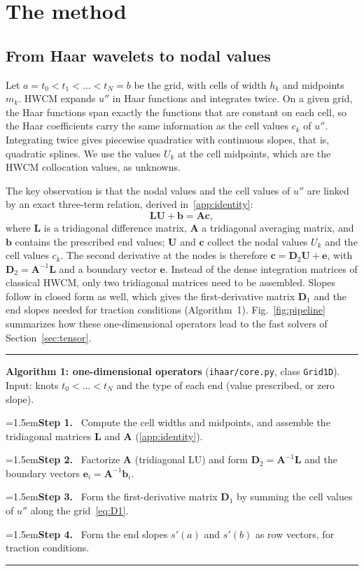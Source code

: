 \documentclass[preprint,12pt]{elsarticle}
\theoremstyle{remark}
\newcommand{\step}[1]{\par\noindent\hangindent=1.5em\hangafter=1\textbf{Step #1.}\ }
\begin{document}
\section{The method}\label{sec:method}
\subsection{From Haar wavelets to nodal values}
Let $a=t_0<t_1<\dots<t_N=b$ be the grid, with cells of width $h_k$ and midpoints $m_k$. HWCM expands
$u''$ in Haar functions and integrates twice. On a given grid, the Haar functions span exactly the
functions that are constant on each cell, so the Haar coefficients carry the same information as the
cell values $c_k$ of $u''$. Integrating twice gives piecewise quadratics with continuous slopes, that is,
quadratic splines. We use the values $U_k$ at the cell midpoints, which are the HWCM collocation values,
as unknowns.

The key observation is that the nodal values and the cell values of $u''$ are linked by an exact
three-term relation, derived in~\ref{app:identity}:
\begin{equation}\label{eq:identity}
\mathbf L\mathbf U+\mathbf b=\mathbf A\mathbf c,
\end{equation}
where $\mathbf L$ is a tridiagonal difference matrix, $\mathbf A$ a tridiagonal averaging matrix, and $\mathbf b$ contains the
prescribed end values; $\mathbf U$ and $\mathbf c$ collect the nodal values $U_k$ and the cell values $c_k$. The second derivative at the nodes is therefore $\mathbf c=\mathbf D_2\mathbf U+\mathbf e$, with $\mathbf D_2=\mathbf A^{-1}\mathbf L$
and a boundary vector $\mathbf e$. Instead of the dense integration matrices of classical HWCM, only two
tridiagonal matrices need to be assembled. Slopes follow in closed form as well, which gives the
first-derivative matrix $\mathbf D_1$ and the end slopes needed for traction conditions (Algorithm~1).
Fig.~\ref{fig:pipeline} summarizes how these one-dimensional operators lead to the fast solvers of
Section~\ref{sec:tensor}.

\begin{algorithm}[t]\small\hrule\smallskip
\noindent\textbf{Algorithm 1: one-dimensional operators} (\texttt{ihaar/core.py}, class \texttt{Grid1D}).
Input: knots $t_0<\dots<t_N$ and the type of each end (value prescribed, or zero slope).
\step{1} Compute the cell widths and midpoints, and assemble the tridiagonal matrices $\mathbf L$ and $\mathbf A$ (\ref{app:identity}).
\step{2} Factorize $\mathbf A$ (tridiagonal LU) and form $\mathbf D_2=\mathbf A^{-1}\mathbf L$ and the boundary vectors $\mathbf e_i=\mathbf A^{-1}\mathbf b_i$.
\step{3} Form the first-derivative matrix $\mathbf D_1$ by summing the cell values of $u''$ along the grid~\eqref{eq:D1}.
\step{4} Form the end slopes $s'(a)$ and $s'(b)$ as row vectors, for traction conditions.
\smallskip\hrule
\end{algorithm}
\end{document}
